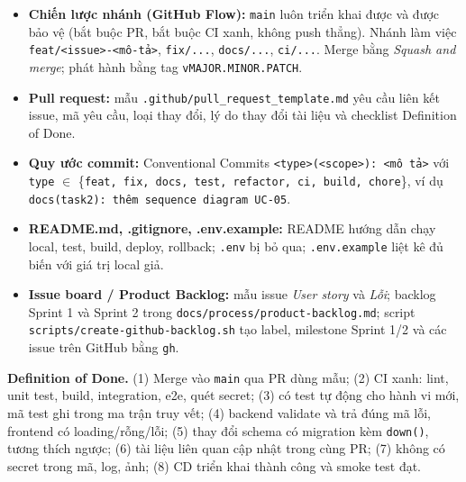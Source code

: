 \documentclass[a4paper]{article}
\newcommand{\st}[1]{\texttt{#1}}
\begin{document}
\begin{itemize}
  \item \textbf{Chiến lược nhánh (GitHub Flow):} \st{main} luôn triển khai được và được bảo vệ (bắt buộc PR, bắt buộc CI xanh, không push thẳng). Nhánh làm việc \st{feat/<issue>-<mô-tả>}, \st{fix/...}, \st{docs/...}, \st{ci/...}. Merge bằng \textit{Squash and merge}; phát hành bằng tag \st{vMAJOR.MINOR.PATCH}.
  \item \textbf{Pull request:} mẫu \st{.github/pull\_request\_template.md} yêu cầu liên kết issue, mã yêu cầu, loại thay đổi, lý do thay đổi tài liệu và checklist Definition of Done.
  \item \textbf{Quy ước commit:} Conventional Commits \st{<type>(<scope>): <mô tả>} với \st{type} $\in$ \{\st{feat, fix, docs, test, refactor, ci, build, chore}\}, ví dụ \st{docs(task2): thêm sequence diagram UC-05}.
  \item \textbf{README.md, .gitignore, .env.example:} README hướng dẫn chạy local, test, build, deploy, rollback; \st{.env} bị bỏ qua; \st{.env.example} liệt kê đủ biến với giá trị local giả.
  \item \textbf{Issue board / Product Backlog:} mẫu issue \textit{User story} và \textit{Lỗi}; backlog Sprint 1 và Sprint 2 trong \st{docs/process/product-backlog.md}; script \st{scripts/create-github-backlog.sh} tạo label, milestone Sprint 1/2 và các issue trên GitHub bằng \st{gh}.
\end{itemize}

\textbf{Definition of Done.} (1) Merge vào \st{main} qua PR dùng mẫu; (2) CI xanh: lint, unit test, build, integration, e2e, quét secret; (3) có test tự động cho hành vi mới, mã test ghi trong ma trận truy vết; (4) backend validate và trả đúng mã lỗi, frontend có loading/rỗng/lỗi; (5) thay đổi schema có migration kèm \st{down()}, tương thích ngược; (6) tài liệu liên quan cập nhật trong cùng PR; (7) không có secret trong mã, log, ảnh; (8) CD triển khai thành công và smoke test đạt.
\end{document}
